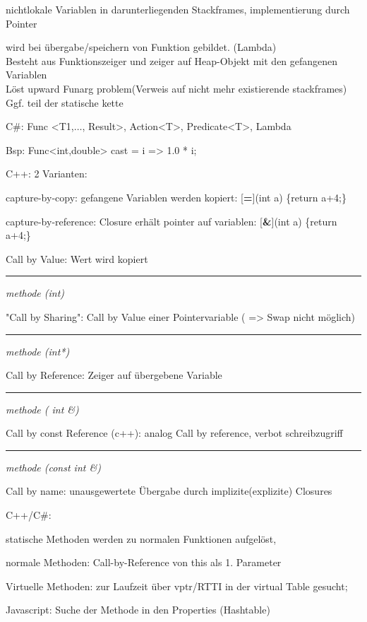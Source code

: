  nichtlokale Variablen in darunterliegenden Stackframes, implementierung durch Pointer

 wird bei übergabe/speichern von Funktion gebildet. (Lambda)\\ 
Besteht aus Funktionszeiger und zeiger auf Heap-Objekt mit den gefangenen Variablen\\
Löst upward Funarg problem(Verweis auf nicht mehr existierende stackframes)\\
Ggf. teil der statische kette

C\#: Func <T1,$\dots$, Result>, Action<T>, Predicate<T>, Lambda

Bsp:   Func<int,double> cast = i => 1.0 * i;


C++: 2 Varianten: 


capture-by-copy: gefangene Variablen werden kopiert: [\textbf{=}](int a) \{return a+4;\}

capture-by-reference: Closure erhält pointer auf variablen: [\textbf{\&}](int a) \{return a+4;\}

Call by Value: Wert wird kopiert  

\rule{1cm}{0pt}
\textit{methode (int)}

"Call by Sharing": Call by Value einer Pointervariable ( => Swap nicht möglich)

\rule{1cm}{0pt}\textit{methode (int*)}

Call by Reference: Zeiger auf übergebene Variable

\rule{1cm}{0pt}\textit{methode ( int \&)}

Call by const Reference (c++): analog Call by reference, verbot schreibzugriff

\rule{1cm}{0pt}\textit{methode (const int \&)}

Call by name: unausgewertete Übergabe durch implizite(explizite) Closures


C++/C\#:

statische Methoden werden zu normalen Funktionen aufgelöst, 

normale Methoden: Call-by-Reference von this als 1. Parameter

Virtuelle Methoden: zur Laufzeit über vptr/RTTI in der virtual Table gesucht;

Javascript: Suche der Methode in den Properties (Hashtable)

